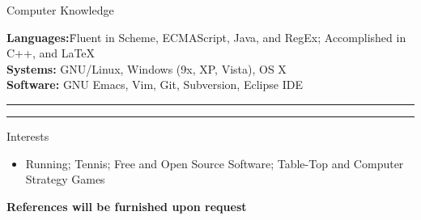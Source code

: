 \documentclass[10pt]{letter}
\begin{document}
{\Large Computer Knowledge}
\begin{tabbing}
\textbf{Languages:}\hspace{.2in}\= Fluent in Scheme, ECMAScript,
                   Java, and RegEx; Accomplished in C++, and \LaTeX\\
\textbf{Systems:}\> GNU/Linux, Windows (9x, XP, Vista), OS X\\
\textbf{Software:}\> GNU Emacs, Vim, Git, Subversion, Eclipse IDE
\end{tabbing}\vspace{-15pt}

\rule{\linewidth}{.5pt}





\vspace{-15pt}

\rule{\linewidth}{.5pt}

{\Large Interests}\vspace{-5pt}
\begin{itemize}
\setlength\itemsep{1pt}
\item Running; Tennis; Free and Open Source Software; Table-Top and Computer Strategy Games
\end{itemize}
\begin{center}\textbf{References will be furnished upon request}\end{center}
\end{document}

